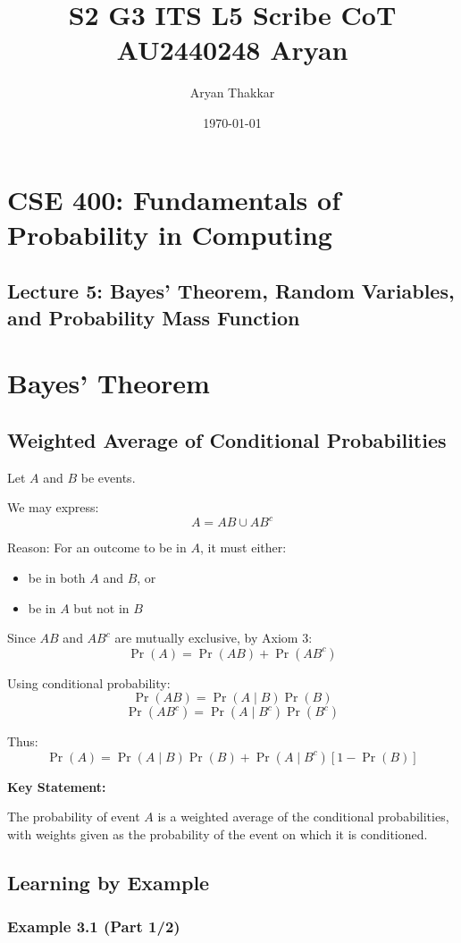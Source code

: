 \documentclass[12pt]{article}
\title{S2 G3 ITS L5 Scribe CoT AU2440248 Aryan}
\author{Aryan Thakkar}
\date{\today}
\begin{document}
\maketitle
\section*{CSE 400: Fundamentals of Probability in Computing}
\subsection*{Lecture 5: Bayes' Theorem, Random Variables, and Probability Mass Function}

\section{Bayes' Theorem}

\subsection{Weighted Average of Conditional Probabilities}

Let $A$ and $B$ be events.

We may express:
\[
A = AB \cup AB^c
\]

Reason: For an outcome to be in $A$, it must either:
\begin{itemize}
    \item be in both $A$ and $B$, or
    \item be in $A$ but not in $B$
\end{itemize}

Since $AB$ and $AB^c$ are mutually exclusive, by Axiom 3:
\[
\Pr(A) = \Pr(AB) + \Pr(AB^c)
\]

Using conditional probability:
\[
\Pr(AB) = \Pr(A \mid B)\Pr(B)
\]
\[
\Pr(AB^c) = \Pr(A \mid B^c)\Pr(B^c)
\]

Thus:
\[
\Pr(A) = \Pr(A \mid B)\Pr(B) + \Pr(A \mid B^c)[1-\Pr(B)]
\]

\textbf{Key Statement:}

The probability of event $A$ is a weighted average of the conditional probabilities, with weights given as the probability of the event on which it is conditioned.

\subsection{Learning by Example}

\subsubsection*{Example 3.1 (Part 1/2)}
\end{document}

